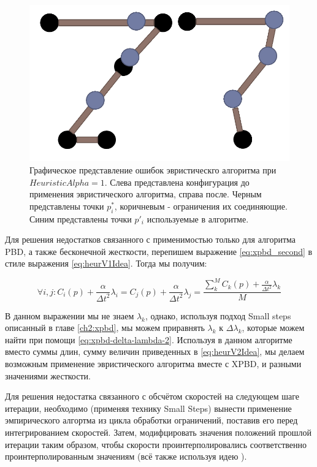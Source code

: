 	\begin{figure}[ht!] 
		\center
		\includegraphics [scale=0.4] {my_folder/images//heuristicSchemaFail}
		\caption{Графическое представление ошибок эвристическго алгоритма при $HeuristicAlpha = 1$. Слева представлена конфигурация до применения эвристического алгоритма, справа после. Черным представлены точки $p^*_i$, коричневым - ограничения их соединяющие. Синим представлены точки $p'_i$ используемые в алгоритме.}
		\label{fig:heuristicSchemaFail}  
	\end{figure}	
	\FloatBarrier 
	
	Для решения недостатков связанного с применимостью только для алгоритма PBD, а также бесконечной жесткости, перепишем выражение \ref{eq:xpbd_second} в стиле выражения \ref{eq:heurV1Idea}. Тогда мы получим:
	
	\begin{equation} \label{eq:heurV2Idea}
		\forall i,j : C_i(p) + \frac{\alpha}{\Delta t^2}\lambda_i = C_j(p) + \frac{\alpha}{\Delta t^2}\lambda_j = \frac{\sum_k^M C_k(p) + \frac{\alpha}{\Delta t^2}\lambda_k}{M}
	\end{equation}
	
	В данном выражении мы не знаем $\lambda_k$, однако, используя подход Small steps описанный в главе \ref{ch2:xpbd}, мы можем приравнять $\lambda_k$ к $\Delta \lambda_k$, которые можем найти при помощи \ref{eq:xpbd-delta-lambda-2}. Используя в данном алгоритме вместо суммы длин, сумму величин приведенных в \ref{eq:heurV2Idea}, мы делаем возможным применение эвристического алгоритма вместе с XPBD, и разными значениями жесткости.
	
	Для решения недостатка связанного с обсчётом скоростей на следующем шаге итерации, необходимо (применяя технику Small Steps) вынести применение эмпирического алгортма из цикла обработки ограничений, поставив его перед интегрированием скоростей. Затем, модифцировать значения положений прошлой итерации таким образом, чтобы скорости проинтерполировались соответственно проинтерполированным значениям (всё также используя идею ).
	

